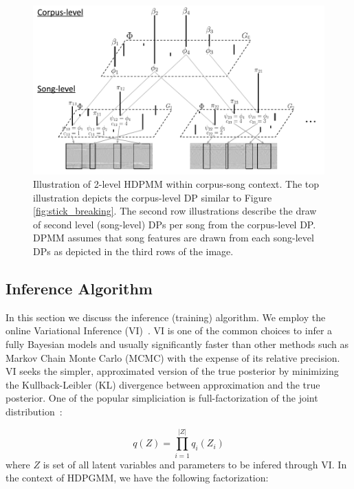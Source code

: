 \documentclass{article}
\begin{document}
\begin{figure}[ht]
    \centering
    \includegraphics[width=\linewidth]{figs/HDP-stick-breaking.pdf}
    \caption{Illustration of 2-level HDPMM within corpus-song context. The top illustration depicts the corpus-level DP similar to Figure \ref{fig:stick_breaking}. The second row illustrations describe the draw of second level (song-level) DPs per song from the corpus-level DP. DPMM assumes that song features are drawn from each song-level DPs as depicted in the third rows of the image.}
    \label{fig:hdpmm}
\end{figure}


\subsection{Inference Algorithm}\label{sec:hdpgmm:inference}

In this section we discuss the inference (training) algorithm. We employ the online Variational Inference (VI)~\cite{DBLP:journals/jmlr/WangPB11}. VI is one of the common choices to infer a fully Bayesian models and usually significantly faster than other methods such as Markov Chain Monte Carlo (MCMC) with the expense of its relative precision. VI seeks the simpler, approximated version of the true posterior by minimizing the Kullback-Leibler (KL) divergence between approximation and the true posterior.
One of the popular simpliciation is full-factorization of the joint distribution~\cite{DBLP:journals/jei/BishopN07}:

\begin{equation}\label{eq:meanfield_vi_general}
    q(Z) = \prod^{|Z|}_{i=1} q_{i}(Z_{i})
\end{equation}
where $Z$ is set of all latent variables and parameters to be infered through VI. In the context of HDPGMM, we have the following factorization:
\end{document}
